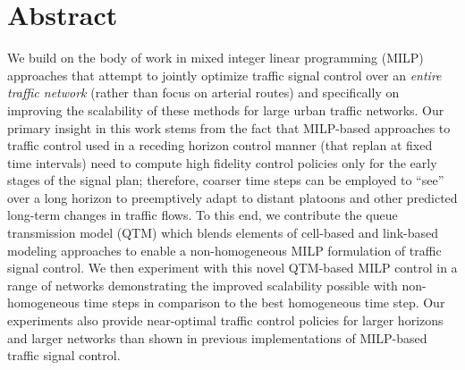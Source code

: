 \section*{Abstract}


We build on the body of work in mixed integer linear programming
(MILP) approaches that attempt to jointly optimize traffic signal
control over an \emph{entire traffic network} (rather than focus on
arterial routes) and specifically on improving the scalability of
these methods for large urban traffic networks.  Our primary insight
in this work stems from the fact that MILP-based approaches to traffic
control used in a receding horizon control manner (that replan at
fixed time intervals) need to compute high fidelity control policies
only for the early stages of the signal plan; therefore, coarser
time steps can be employed to ``see'' over a long horizon to preemptively adapt to
distant platoons and other predicted long-term changes in traffic
flows.  To this end, we contribute the queue transmission model (QTM)
which blends elements of cell-based and link-based modeling approaches
to enable a non-homogeneous MILP formulation of traffic signal
control.
%
We then experiment with this novel QTM-based MILP control in
a range of networks demonstrating the improved scalability possible
with non-homogeneous time steps in comparison to the best homogeneous
time step.
%
Our experiments also provide near-optimal traffic control policies
for larger horizons and larger networks than shown in previous
implementations of MILP-based traffic signal control.




